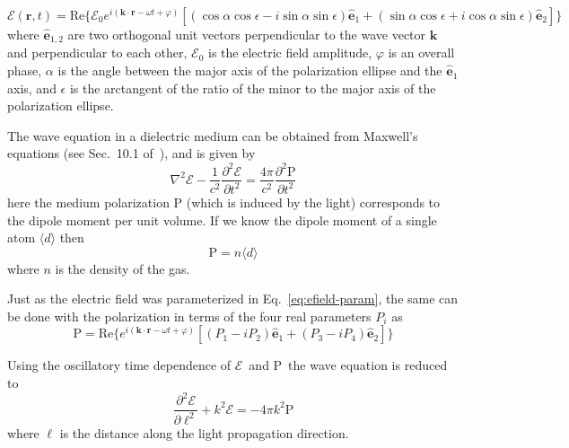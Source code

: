 \documentclass[11pt,letter]{article}
\newcommand{\bv}[1]{\ensuremath{\bm{#1}}}
\newcommand{\efield}{\ensuremath{\bv{\mathcal{E}}}}
\newcommand{\efieldo}{\ensuremath{\mathcal{E}_{0}}}
\newcommand{\dpol}{\ensuremath{\bv{\mathrm{P}}}}
\begin{document}
\begin{equation}
 \efield( \bv{r}, t ) = 
     \text{Re}\lbrace \efieldo e^{i(\bv{k}\cdot\bv{r} - \omega t + \varphi )} 
     [ ( \cos\alpha \cos \epsilon - i \sin\alpha\sin\epsilon) \bv{\hat{e}}_{1} 
   + (\sin\alpha \cos\epsilon + i \cos\alpha\sin\epsilon) \bv{\hat{e}}_{2} ] \rbrace 
  \label{eq:efield-param}
\end{equation}
where $\bv{\hat{e}}_{1,2}$ are two orthogonal unit vectors perpendicular to the
wave vector $\bv{k}$ and perpendicular to each other,  $\efieldo$ is the
electric field amplitude, $\varphi$ is an overall phase,  $\alpha$ is the angle
between the major axis of the polarization ellipse and the $\bv{\hat{e}}_{1}$
axis, and $\epsilon$ is the arctangent of the ratio of the minor to the major
axis of the polarization ellipse. 

The wave equation in a dielectric medium can be obtained from Maxwell's
equations (see Sec.~10.1 of~\cite{auzinsh2010optically}), and is given by
\begin{equation}
 \nabla^{2} \efield 
 -\frac{1}{c^{2}} \frac{\partial^{2} \efield } {\partial t^{2}} 
  = \frac{4\pi}{c^{2}} \frac{\partial^{2} \dpol }{\partial t^{2} } 
\end{equation} 
here the medium polarization $\dpol$ (which is induced by the light)
corresponds to the dipole moment per unit volume.   If we know the dipole
moment of a single atom $\langle d \rangle$ then \begin{equation}
 \dpol = n \langle d \rangle 
\end{equation}
where $n$ is the density of the gas.

Just as the electric field was parameterized in Eq.~\ref{eq:efield-param}, the
same can be done with the polarization in terms of the four real parameters
$P_{i}$ as 
\begin{equation}
 \dpol = \text{Re} \lbrace e^{i(\bv{k}\cdot\bv{r} - \omega t + \varphi) }
   [(P_{1} - i P_{2}) \bv{\hat{e}}_{1} + ( P_{3} - i P_{4}) \bv{\hat{e}}_{2} ] \rbrace
  \label{eq:pol-param}
\end{equation}

Using the oscillatory time dependence of \efield\ and \dpol\ the wave equation
is reduced to 
\begin{equation}
   \frac{ \partial^{2} \efield}{\partial \ell^{2} }  + k^{2} \efield = - 4 \pi k^{2} \dpol
\end{equation}
where $\ell$ is the distance along the light propagation direction. 
\end{document}
